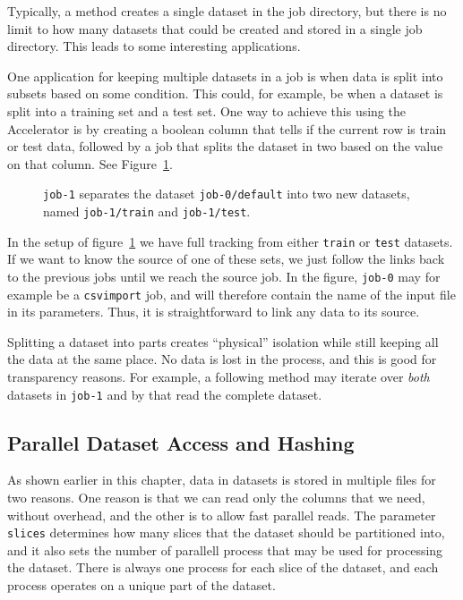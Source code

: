 Typically, a method creates a single dataset in the job directory, but
there is no limit to how many datasets that could be created and
stored in a single job directory.  This leads to some interesting
applications.

One application for keeping multiple datasets in a job is when data is
split into subsets based on some condition.  This could, for example,
be when a dataset is split into a training set and a test set.  One
way to achieve this using the Accelerator is by creating a boolean
column that tells if the current row is train or test data, followed
by a job that splits the dataset in two based on the value on that
column.  See Figure~\ref{fig:dep_dataset_csvimport_chain}.

\begin{figure}[h!]
  \hspace{1cm}
  
  \caption{\texttt{job-1} separates the dataset
    \texttt{job-0/default} into two new datasets, named
    \texttt{job-1/train} and \texttt{job-1/test}.}
  \label{fig:dep_dataset_csvimport_chain}
\end{figure}


In the setup of figure~\ref{fig:dep_dataset_csvimport_chain} we have
full tracking from either \texttt{train} or \texttt{test} datasets.
If we want to know the source of one of these sets, we just follow the
links back to the previous jobs until we reach the source job.  In the
figure, \texttt{job-0} may for example be a \texttt{csvimport} job,
and will therefore contain the name of the input file in its
parameters.  Thus, it is straightforward to link any data to its
source.

Splitting a dataset into parts creates ``physical'' isolation while
still keeping all the data at the same place.  No data is lost in the
process, and this is good for transparency reasons.  For example, a
following method may iterate over \textsl{both} datasets in
\texttt{job-1} and by that read the complete dataset.



\subsection{Parallel Dataset Access and Hashing}
As shown earlier in this chapter, data in datasets is stored in
multiple files for two reasons.  One reason is that we can read only
the columns that we need, without overhead, and the other is to allow
fast parallel reads.  The parameter \texttt{slices} determines how
many slices that the dataset should be partitioned into, and it also
sets the number of parallell process that may be used for processing
the dataset.  There is always one process for each slice of the
dataset, and each process operates on a unique part of the dataset.

